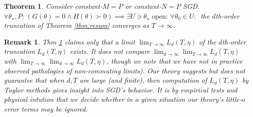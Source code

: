 \documentclass[anon,12pt]{colt2021} %
\newtheorem{thm}{Theorem}
\newtheorem{rmk}{Remark}
\begin{document}
{            %
            \begin{thm} \label{thm:converge}
                Consider constant-$M=P$ or constant-$N=P$ SGD.
                $\forall \theta_\star,P:\, (G(\theta)=0 \wedge H(\theta)\succ
                0) \implies \exists U\ni \theta_\star\,\,\text{open}:\, \forall
                \theta_0\in U:\,$
                the $d$th-order truncation of Theorem \ref{thm:resum} converges
                as $T\to \infty$.
            \end{thm}
            \begin{rmk}
                \emph{
                Thm \ref{thm:converge} claims only that a limit
                $\lim_{T\to\infty} L_d(T,\eta)$ of the
                $d$th-order truncation $L_d(T,\eta)$ exists.
                It does not compare $\lim_{d\to\infty}
                \lim_{T\to\infty} L_d(T,\eta)$ with $\lim_{T\to\infty}
                \lim_{d\to\infty} L_d(T,\eta)$, though we note that we have not in practice
                observed pathologies of non-commuting limits).
                Our theory suggests but does not guarantee that when $d, T$ are
                large (and finite), then computation of $L_d(T,\eta)$ by Taylor
                methods gives insight into SGD's behavior.  It is by empirical
                tests and physical intution that we decide whether in a given
                situation our theory's little-$o$ error terms may be ignored. 
                }
            \end{rmk}

}
\end{document}
